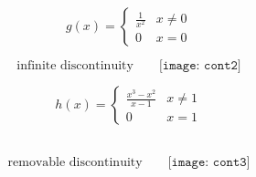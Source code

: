 \documentclass{beamer}
\begin{document}
\begin{frame}{
	$$g(x)=\begin{cases}
\frac{1}{x^2} & x\neq 0\\
0 & x=0
\end{cases}$$}
\begin{mdframed}
	$$\text{infinite discontinuity}\quad \quad 
	\texttt{[image: cont2]}
	$$
\end{mdframed}
\end{frame}


\begin{frame}{
$$h(x)=\begin{cases}
\frac{x^3-x^2}{x-1} & x\neq 1\\
0 & x=1
\end{cases}$$}
~~
\begin{mdframed}
	$$\text{removable discontinuity}\quad \quad 
	\texttt{[image: cont3]}
	$$
\end{mdframed}
\end{frame}
\end{document}
